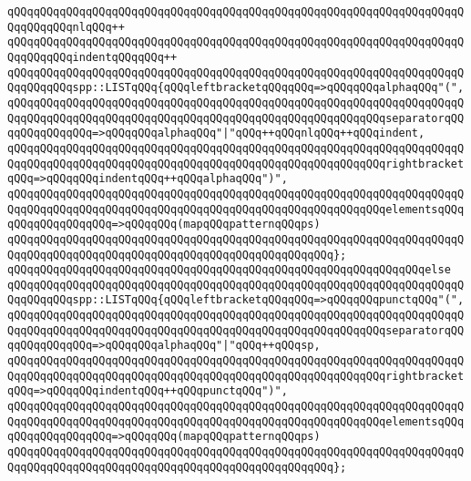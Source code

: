 \verb|qQQqqQQqqQQqqQQqqQQqqQQqqQQqqQQqqQQqqQQqqQQqqQQqqQQqqQQqqQQqqQQqqQQqqQQqqQQqqQQqnlqQQq++|\newline
\verb|qQQqqQQqqQQqqQQqqQQqqQQqqQQqqQQqqQQqqQQqqQQqqQQqqQQqqQQqqQQqqQQqqQQqqQQqqQQqqQQqindentqQQqqQQq++|\newline
\verb|qQQqqQQqqQQqqQQqqQQqqQQqqQQqqQQqqQQqqQQqqQQqqQQqqQQqqQQqqQQqqQQqqQQqqQQqqQQqqQQqspp::LISTqQQq{qQQqleftbracketqQQqqQQq=>qQQqqQQqalphaqQQq"(",|\newline
\verb|qQQqqQQqqQQqqQQqqQQqqQQqqQQqqQQqqQQqqQQqqQQqqQQqqQQqqQQqqQQqqQQqqQQqqQQqqQQqqQQqqQQqqQQqqQQqqQQqqQQqqQQqqQQqqQQqqQQqqQQqqQQqqQQqseparatorqQQqqQQqqQQqqQQq=>qQQqqQQqalphaqQQq"|\verb#|"qQQq++qQQqnlqQQq++qQQqindent,#\newline
\verb|qQQqqQQqqQQqqQQqqQQqqQQqqQQqqQQqqQQqqQQqqQQqqQQqqQQqqQQqqQQqqQQqqQQqqQQqqQQqqQQqqQQqqQQqqQQqqQQqqQQqqQQqqQQqqQQqqQQqqQQqqQQqqQQqrightbracketqQQq=>qQQqqQQqindentqQQq++qQQqalphaqQQq")",|\newline
\verb|qQQqqQQqqQQqqQQqqQQqqQQqqQQqqQQqqQQqqQQqqQQqqQQqqQQqqQQqqQQqqQQqqQQqqQQqqQQqqQQqqQQqqQQqqQQqqQQqqQQqqQQqqQQqqQQqqQQqqQQqqQQqqQQqelementsqQQqqQQqqQQqqQQqqQQq=>qQQqqQQq(mapqQQqpatternqQQqps)|\newline
\verb|qQQqqQQqqQQqqQQqqQQqqQQqqQQqqQQqqQQqqQQqqQQqqQQqqQQqqQQqqQQqqQQqqQQqqQQqqQQqqQQqqQQqqQQqqQQqqQQqqQQqqQQqqQQqqQQqqQQqqQQq};|\newline
\verb|qQQqqQQqqQQqqQQqqQQqqQQqqQQqqQQqqQQqqQQqqQQqqQQqqQQqqQQqqQQqqQQqelse|\newline
\verb|qQQqqQQqqQQqqQQqqQQqqQQqqQQqqQQqqQQqqQQqqQQqqQQqqQQqqQQqqQQqqQQqqQQqqQQqqQQqqQQqspp::LISTqQQq{qQQqleftbracketqQQqqQQq=>qQQqqQQqpunctqQQq"(",|\newline
\verb|qQQqqQQqqQQqqQQqqQQqqQQqqQQqqQQqqQQqqQQqqQQqqQQqqQQqqQQqqQQqqQQqqQQqqQQqqQQqqQQqqQQqqQQqqQQqqQQqqQQqqQQqqQQqqQQqqQQqqQQqqQQqqQQqseparatorqQQqqQQqqQQqqQQq=>qQQqqQQqalphaqQQq"|\verb#|"qQQq++qQQqsp,#\newline
\verb|qQQqqQQqqQQqqQQqqQQqqQQqqQQqqQQqqQQqqQQqqQQqqQQqqQQqqQQqqQQqqQQqqQQqqQQqqQQqqQQqqQQqqQQqqQQqqQQqqQQqqQQqqQQqqQQqqQQqqQQqqQQqqQQqrightbracketqQQq=>qQQqqQQqindentqQQq++qQQqpunctqQQq")",|\newline
\verb|qQQqqQQqqQQqqQQqqQQqqQQqqQQqqQQqqQQqqQQqqQQqqQQqqQQqqQQqqQQqqQQqqQQqqQQqqQQqqQQqqQQqqQQqqQQqqQQqqQQqqQQqqQQqqQQqqQQqqQQqqQQqqQQqelementsqQQqqQQqqQQqqQQqqQQq=>qQQqqQQq(mapqQQqpatternqQQqps)|\newline
\verb|qQQqqQQqqQQqqQQqqQQqqQQqqQQqqQQqqQQqqQQqqQQqqQQqqQQqqQQqqQQqqQQqqQQqqQQqqQQqqQQqqQQqqQQqqQQqqQQqqQQqqQQqqQQqqQQqqQQqqQQq};|\newline
